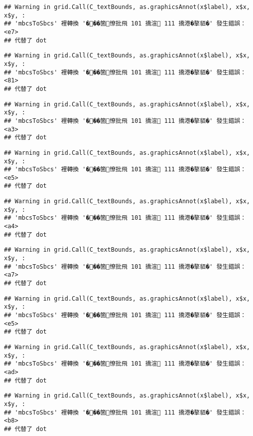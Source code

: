 \documentclass[
]{article}
\begin{document}
\begin{verbatim}
## Warning in grid.Call(C_textBounds, as.graphicsAnnot(x$label), x$x, x$y, :
## 'mbcsToSbcs' 裡轉換 '���箇憭批飛 101 撟渲 111 撟港�摮貊�' 發生錯誤：<e7>
## 代替了 dot
\end{verbatim}

\begin{verbatim}
## Warning in grid.Call(C_textBounds, as.graphicsAnnot(x$label), x$x, x$y, :
## 'mbcsToSbcs' 裡轉換 '���箇憭批飛 101 撟渲 111 撟港�摮貊�' 發生錯誤：<81>
## 代替了 dot
\end{verbatim}

\begin{verbatim}
## Warning in grid.Call(C_textBounds, as.graphicsAnnot(x$label), x$x, x$y, :
## 'mbcsToSbcs' 裡轉換 '���箇憭批飛 101 撟渲 111 撟港�摮貊�' 發生錯誤：<a3>
## 代替了 dot
\end{verbatim}

\begin{verbatim}
## Warning in grid.Call(C_textBounds, as.graphicsAnnot(x$label), x$x, x$y, :
## 'mbcsToSbcs' 裡轉換 '���箇憭批飛 101 撟渲 111 撟港�摮貊�' 發生錯誤：<e5>
## 代替了 dot
\end{verbatim}

\begin{verbatim}
## Warning in grid.Call(C_textBounds, as.graphicsAnnot(x$label), x$x, x$y, :
## 'mbcsToSbcs' 裡轉換 '���箇憭批飛 101 撟渲 111 撟港�摮貊�' 發生錯誤：<a4>
## 代替了 dot
\end{verbatim}

\begin{verbatim}
## Warning in grid.Call(C_textBounds, as.graphicsAnnot(x$label), x$x, x$y, :
## 'mbcsToSbcs' 裡轉換 '���箇憭批飛 101 撟渲 111 撟港�摮貊�' 發生錯誤：<a7>
## 代替了 dot
\end{verbatim}

\begin{verbatim}
## Warning in grid.Call(C_textBounds, as.graphicsAnnot(x$label), x$x, x$y, :
## 'mbcsToSbcs' 裡轉換 '���箇憭批飛 101 撟渲 111 撟港�摮貊�' 發生錯誤：<e5>
## 代替了 dot
\end{verbatim}

\begin{verbatim}
## Warning in grid.Call(C_textBounds, as.graphicsAnnot(x$label), x$x, x$y, :
## 'mbcsToSbcs' 裡轉換 '���箇憭批飛 101 撟渲 111 撟港�摮貊�' 發生錯誤：<ad>
## 代替了 dot
\end{verbatim}

\begin{verbatim}
## Warning in grid.Call(C_textBounds, as.graphicsAnnot(x$label), x$x, x$y, :
## 'mbcsToSbcs' 裡轉換 '���箇憭批飛 101 撟渲 111 撟港�摮貊�' 發生錯誤：<b8>
## 代替了 dot
\end{verbatim}
\end{document}
